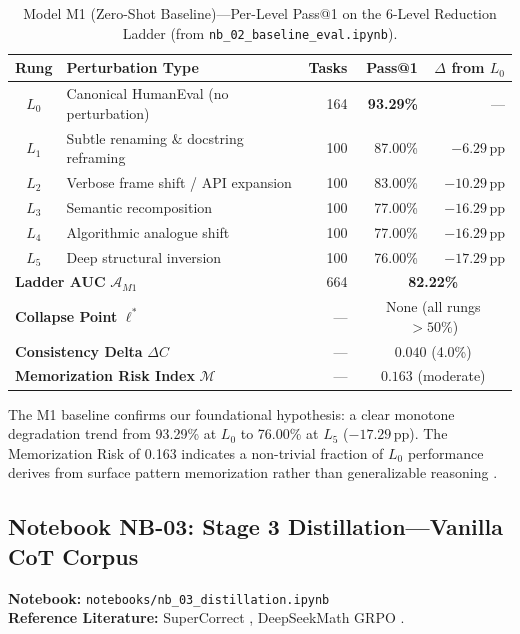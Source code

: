\documentclass[12pt, a4paper]{article}
\begin{document}
\begin{table}[H]
\centering
\small
\caption{Model M1 (Zero-Shot Baseline)---Per-Level Pass@1 on the 6-Level Reduction Ladder (from \texttt{nb\_02\_baseline\_eval.ipynb}).}
\label{tab:m1_per_level}
\begin{tabularx}{\textwidth}{c l r r r}
\toprule
\textbf{Rung} & \textbf{Perturbation Type} & \textbf{Tasks} & \textbf{Pass@1} & \textbf{$\Delta$ from $L_0$} \\
\midrule
$L_0$ & Canonical HumanEval (no perturbation) \cite{evoeval}  & 164 & \textbf{93.29\%} & --- \\
$L_1$ & Subtle renaming \& docstring reframing               & 100 & 87.00\%          & $-6.29$\,pp \\
$L_2$ & Verbose frame shift / API expansion                  & 100 & 83.00\%          & $-10.29$\,pp \\
$L_3$ & Semantic recomposition                               & 100 & 77.00\%          & $-16.29$\,pp \\
$L_4$ & Algorithmic analogue shift                           & 100 & 77.00\%          & $-16.29$\,pp \\
$L_5$ & Deep structural inversion                            & 100 & 76.00\%          & $-17.29$\,pp \\
\midrule
\multicolumn{2}{l}{\textbf{Ladder AUC} $\mathcal{A}_{M1}$}      & 664 & \multicolumn{2}{c}{\textbf{82.22\%}} \\
\multicolumn{2}{l}{\textbf{Collapse Point} $\ell^*$}            & ---  & \multicolumn{2}{c}{None (all rungs $>50\%$)} \\
\multicolumn{2}{l}{\textbf{Consistency Delta} $\Delta C$}       & ---  & \multicolumn{2}{c}{$0.040$ (4.0\%)} \\
\multicolumn{2}{l}{\textbf{Memorization Risk Index} $\mathcal{M}$} & --- & \multicolumn{2}{c}{$0.163$ (moderate)} \\
\bottomrule
\end{tabularx}
\end{table}

\noindent The M1 baseline confirms our foundational hypothesis: a clear monotone degradation trend \cite{evoeval, gsm_symbolic} from 93.29\% at $L_0$ to 76.00\% at $L_5$ ($-17.29$\,pp). The Memorization Risk of 0.163 indicates a non-trivial fraction of $L_0$ performance derives from surface pattern memorization rather than generalizable reasoning \cite{memorize_or_generalize, learned_or_memorized}.

\subsection{Notebook NB-03: Stage 3 Distillation---Vanilla CoT Corpus}
\textbf{Notebook:} \texttt{notebooks/nb\_03\_distillation.ipynb}\\
\textbf{Reference Literature:} SuperCorrect \cite{supercorrect}, DeepSeekMath GRPO \cite{grpo_deepseek}.
\end{document}

